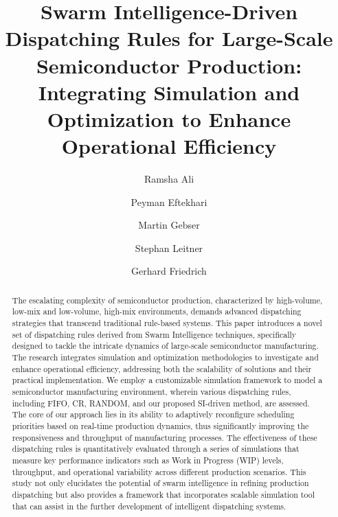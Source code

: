 \documentclass[runningheads]{llncs}
\begin{document}
%
\title{Swarm Intelligence-Driven Dispatching Rules for Large-Scale Semiconductor Production: Integrating Simulation and Optimization to Enhance Operational Efficiency
}
%
%
\author{Ramsha Ali \and
Peyman Eftekhari \and
Martin Gebser \and
Stephan Leitner \and
Gerhard Friedrich
}
%
%

%
\maketitle              %
%
\begin{abstract}
The escalating complexity of semiconductor production, characterized by high-volume, low-mix and low-volume, high-mix environments, demands advanced dispatching strategies that transcend traditional rule-based systems. This paper introduces a novel set of dispatching rules derived from Swarm Intelligence techniques, specifically designed to tackle the intricate dynamics of large-scale semiconductor manufacturing. The research integrates simulation and optimization methodologies to investigate and enhance operational efficiency, addressing both the scalability of solutions and their practical implementation. We employ a customizable simulation framework to model a semiconductor manufacturing environment, wherein various dispatching rules, including FIFO, CR, RANDOM, and our proposed SI-driven method, are assessed. The core of our approach lies in its ability to adaptively reconfigure scheduling priorities based on real-time production dynamics, thus significantly improving the responsiveness and throughput of manufacturing processes.
The effectiveness of these dispatching rules is quantitatively evaluated through a series of simulations that measure key performance indicators such as Work in Progress (WIP) levels, throughput, and operational variability across different production scenarios.
This study not only elucidates the potential of swarm intelligence in refining production dispatching but also provides a framework that incorporates scalable simulation tool that can assist in the further development of intelligent dispatching systems. 

\end{abstract}
%
%
%
\end{document}
